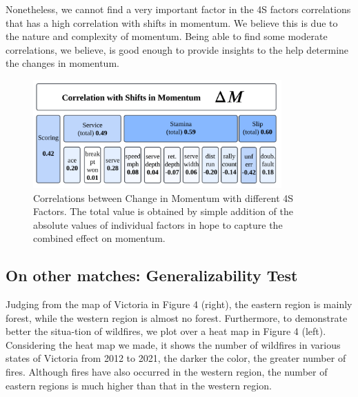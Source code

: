 \documentclass[12pt]{article}  %
\begin{document}
Nonetheless, we cannot find a very important factor in the 4S factors correlations that has a high correlation with shifts in momentum. We believe this is due to the nature and complexity of momentum. Being able to find some moderate correlations, we believe, is good enough to provide insights to the help determine the changes in momentum.

\begin{figure}[htbp]  %
	\centering  %
	\includegraphics[width=0.85\textwidth]{correlation.png} %
	\caption{Correlations between Change in Momentum with different 4S Factors. The total value is obtained by simple addition of the absolute values of individual factors in hope to capture the combined effect on momentum.} %
\end{figure}
\vspace{-0.2cm}

\subsection{On other matches: Generalizability Test}

Judging from the map of Victoria in Figure 4 (right), the eastern region is mainly forest, while the western region is almost no forest. Furthermore, to demonstrate better the situa-tion of wildfires, we plot over a heat map in Figure 4 (left).
Considering the heat map we made, it shows the number of wildfires in various states of Victoria from 2012 to 2021, the darker the color, the greater number of fires. Although fires have also occurred in the western region, the number of eastern regions is much higher than that in the western region. 
\end{document}
